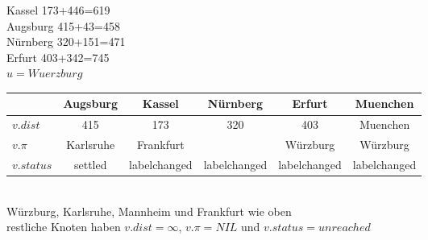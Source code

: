 \documentclass{article}
\begin{document}
\begin{enumerate}
Kassel 173+446=619\\
Augsburg 415+43=458\\
Nürnberg 320+151=471 \\
Erfurt 403+342=745 \\
$u=Wuerzburg$ \\
  \begin{tabular}{| l | c | c | c | c | c |}
    \hline
      & Augsburg & Kassel & Nürnberg & Erfurt & Muenchen\\ \hline
    $v.dist$ & 415 & 173 & 320 & 403 & Muenchen \\ \hline
    $v.\pi$ & Karlsruhe & Frankfurt &  & Würzburg & Würzburg &  \\ \hline 
    $v.status$ & settled & labelchanged & labelchanged & labelchanged & labelchanged \\
    \hline
  \end{tabular}\\
  Würzburg, Karlsruhe, Mannheim und Frankfurt wie oben \\
  restliche Knoten haben $v.dist=\infty$, $v.\pi=NIL$ und $v.status=unreached$
\end{enumerate}
\end{document}
